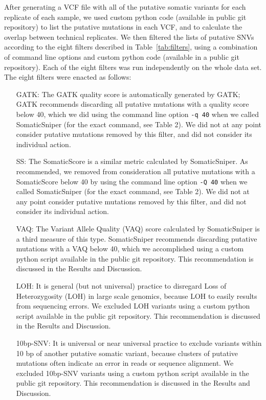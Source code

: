 \documentclass[11 pt]{article} %
\begin{document}
After generating a VCF file with all of the putative somatic variants for each replicate of each sample, we used custom python code (available in public git repository) to list the putative mutations in each VCF, and to calculate the overlap between technical replicates. We then filtered the lists of putative SNVs according to the eight filters described in Table~\ref{tab:filters}, using a combination of command line options and custom python code (available in a public git repository). Each of the eight filters was run independently on the whole data set. The eight filters were enacted as follows: 

\begin{itemize}
\item[GATK:] The GATK quality score is automatically generated by GATK; GATK recommends discarding all putative mutations with a quality score below 40, which we did using the command line option \texttt{-q 40} when we called SomaticSniper (for the exact command, see Table 2). We did not at any point consider putative mutations removed by this filter, and did not consider its individual action. 
\item[SS:] The SomaticScore is a similar metric calculated by SomaticSniper. As recommended, we removed from consideration all putative mutations with a SomaticScore below 40 by using the command line option \texttt{-Q 40} when we called SomaticSniper (for the exact command, see Table 2). We did not at any point consider putative mutations removed by this filter, and did not consider its individual action. 
\item[VAQ:] The Variant Allele Quality (VAQ) score calculated by SomaticSniper is a third measure of this type. SomaticSniper recommends discarding putative mutations with a VAQ below 40, which we accomplished using a custom python script available in the public git repository. This recommendation is discussed in the Results and Discussion.
\item[LOH:] It is general (but not universal) practice to disregard Loss of Heterozygosity (LOH) in large scale genomics, because LOH to easily results from sequencing errors. We excluded LOH variants using a custom python script available in the public git repository. This recommendation is discussed in the Results and Discussion.
\item[10bp-SNV:] It is universal or near universal practice to exclude variants within 10 bp of another putative somatic variant, because clusters of putative mutations often indicate an error in reads or sequence alignment. We excluded 10bp-SNV variants using a custom python script available in the public git repository. This recommendation is discussed in the Results and Discussion.

\end{itemize}
\end{document}
